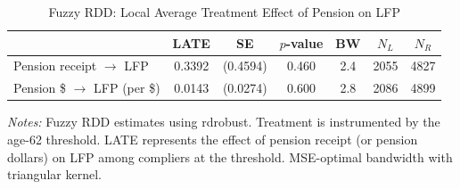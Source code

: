 \begin{table}[htbp]
\centering
\caption{Fuzzy RDD: Local Average Treatment Effect of Pension on LFP}
\label{tab:fuzzy}
\begin{tabular}{lcccccc}
\toprule
  & LATE & SE & $p$-value & BW & $N_L$ & $N_R$ \\
\midrule
  Pension receipt $\rightarrow$ LFP & 0.3392 & (0.4594) & 0.460 & 2.4 & 2055 & 4827 \\
  Pension \$ $\rightarrow$ LFP (per \$) & 0.0143 & (0.0274) & 0.600 & 2.8 & 2086 & 4899 \\
\bottomrule
\end{tabular}
\begin{tablenotes}[flushleft]
\small
\item \textit{Notes:} Fuzzy RDD estimates using rdrobust. Treatment is instrumented by the age-62 threshold. LATE represents the effect of pension receipt (or pension dollars) on LFP among compliers at the threshold. MSE-optimal bandwidth with triangular kernel.
\end{tablenotes}
\end{table}
